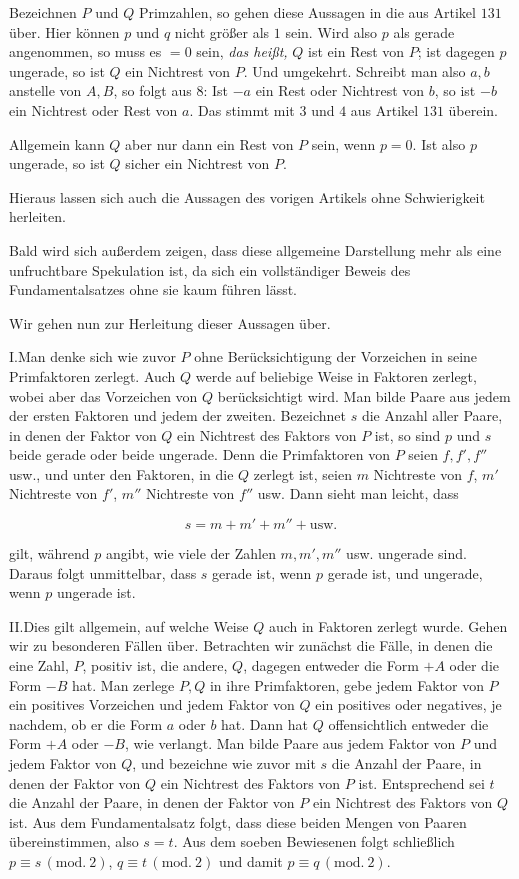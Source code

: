 Bezeichnen $P$ und $Q$ Primzahlen, so gehen diese Aussagen in die aus Artikel $131$ über. Hier können $p$ und $q$ nicht größer als $1$ sein. Wird also $p$ als gerade angenommen, so muss es $=0$ sein, \emph{das heißt,} $Q$ ist ein Rest von $P$; ist dagegen $p$ ungerade, so ist $Q$ ein Nichtrest von $P$. Und umgekehrt. Schreibt man also $a,b$ anstelle von $A,B$, so folgt aus $8$: Ist $-a$ ein Rest oder Nichtrest von $b$, so ist $-b$ ein Nichtrest oder Rest von $a$. Das stimmt mit $3$ und $4$ aus Artikel $131$ überein.

Allgemein kann $Q$ aber nur dann ein Rest von $P$ sein, wenn $p=0$. Ist also $p$ ungerade, so ist $Q$ sicher ein Nichtrest von $P$.

Hieraus lassen sich auch die Aussagen des vorigen Artikels ohne Schwierigkeit herleiten.

Bald wird sich außerdem zeigen, dass diese allgemeine Darstellung mehr als eine unfruchtbare Spekulation ist, da sich ein vollständiger Beweis des Fundamentalsatzes ohne sie kaum führen lässt.

Wir gehen nun zur Herleitung dieser Aussagen über.

I.\quad Man denke sich wie zuvor $P$ ohne Berücksichtigung der Vorzeichen in seine Primfaktoren zerlegt. Auch $Q$ werde auf beliebige Weise in Faktoren zerlegt, wobei aber das Vorzeichen von $Q$ berücksichtigt wird. Man bilde Paare aus jedem der ersten Faktoren und jedem der zweiten. Bezeichnet $s$ die Anzahl aller Paare, in denen der Faktor von $Q$ ein Nichtrest des Faktors von $P$ ist, so sind $p$ und $s$ beide gerade oder beide ungerade. Denn die Primfaktoren von $P$ seien $f,f',f''$ usw., und unter den Faktoren, in die $Q$ zerlegt ist, seien $m$ Nichtreste von $f$, $m'$ Nichtreste von $f'$, $m''$ Nichtreste von $f''$ usw. Dann sieht man leicht, dass

\[
s=m+m'+m''+\text{usw.}
\]

gilt, während $p$ angibt, wie viele der Zahlen $m,m',m''$ usw. ungerade sind. Daraus folgt unmittelbar, dass $s$ gerade ist, wenn $p$ gerade ist, und ungerade, wenn $p$ ungerade ist.

II.\quad Dies gilt allgemein, auf welche Weise $Q$ auch in Faktoren zerlegt wurde. Gehen wir zu besonderen Fällen über. Betrachten wir zunächst die Fälle, in denen die eine Zahl, $P$, positiv ist, die andere, $Q$, dagegen entweder die Form $+A$ oder die Form $-B$ hat. Man zerlege $P,Q$ in ihre Primfaktoren, gebe jedem Faktor von $P$ ein positives Vorzeichen und jedem Faktor von $Q$ ein positives oder negatives, je nachdem, ob er die Form $a$ oder $b$ hat. Dann hat $Q$ offensichtlich entweder die Form $+A$ oder $-B$, wie verlangt. Man bilde Paare aus jedem Faktor von $P$ und jedem Faktor von $Q$, und bezeichne wie zuvor mit $s$ die Anzahl der Paare, in denen der Faktor von $Q$ ein Nichtrest des Faktors von $P$ ist. Entsprechend sei $t$ die Anzahl der Paare, in denen der Faktor von $P$ ein Nichtrest des Faktors von $Q$ ist. Aus dem Fundamentalsatz folgt, dass diese beiden Mengen von Paaren übereinstimmen, also $s=t$. Aus dem soeben Bewiesenen folgt schließlich $p\equiv s\, (\mathrm{mod.}\ 2)$, $q\equiv t\, (\mathrm{mod.}\ 2)$ und damit $p\equiv q\, (\mathrm{mod.}\ 2)$.

